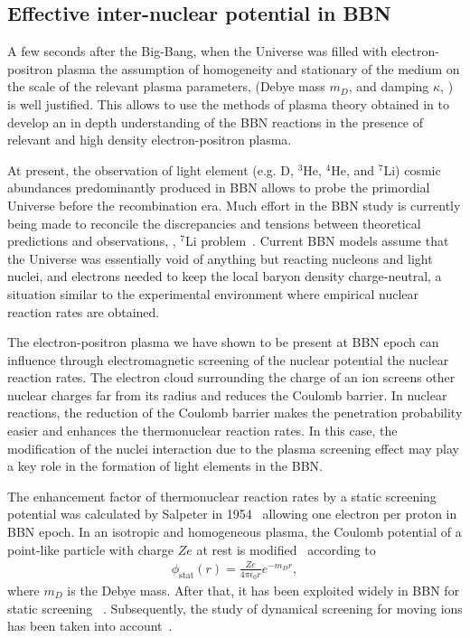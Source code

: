 \subsection{Effective inter-nuclear potential in BBN}\label{sec:potential}

A few seconds after the Big-Bang, when the Universe was filled with electron-positron plasma the assumption of homogeneity and stationary of the medium on the scale of the relevant plasma parameters, (Debye mass $m_D$, and damping $\kappa$, ) is well justified. This allows to use the methods of plasma theory obtained in  to develop an in depth understanding of the BBN reactions in the presence of relevant and high density electron-positron plasma.

At present, the observation of light element 
(e.g. D, $^3$He, $^4$He, and $^7$Li) cosmic abundances predominantly produced in BBN allows to probe the primordial Universe before the recombination era. Much effort in the BBN study is currently being made to reconcile the discrepancies and tensions between theoretical predictions and observations, \eg, $^7$Li problem~\cite{Pitrou:2018cgg}. Current BBN models assume that the Universe was essentially void of anything but reacting nucleons and light nuclei, and electrons needed to keep the local baryon density charge-neutral, a situation similar to the experimental environment where empirical nuclear reaction rates are obtained.

The electron-positron plasma we have shown to be present at BBN epoch can influence through electromagnetic screening of the nuclear potential the nuclear reaction rates. The electron cloud surrounding the charge of an ion screens other nuclear charges far from its radius and reduces the Coulomb barrier. In nuclear reactions, the reduction of the Coulomb barrier makes the penetration probability easier and enhances the thermonuclear reaction rates. In this case, the modification of the nuclei interaction due to the plasma screening effect may play a key role in the formation of light elements in the BBN. 

The enhancement factor of thermonuclear reaction rates by a static screening potential was calculated by Salpeter in 1954~\cite{Salpeter:1954nc} allowing one electron per proton in BBN epoch. In an isotropic and homogeneous plasma, the Coulomb potential of a point-like particle with charge $Ze$ at rest is modified~\cite{Salpeter:1954nc} according to 
\begin{align}
\phi_\text{stat}(r)=\frac{Ze}{4\pi\epsilon_0 r}e^{-m_Dr},
\end{align}
where $m_D$ is the Debye mass. After that, it has been exploited widely in BBN for static screening ~\cite{1969ApJ...155..183S,Famiano:2016hhs}. Subsequently, the study of dynamical screening for moving ions has been taken into account~\cite{Carraro:1988apj,Gruzinov:1997as,Hwang:2021kno}.  

